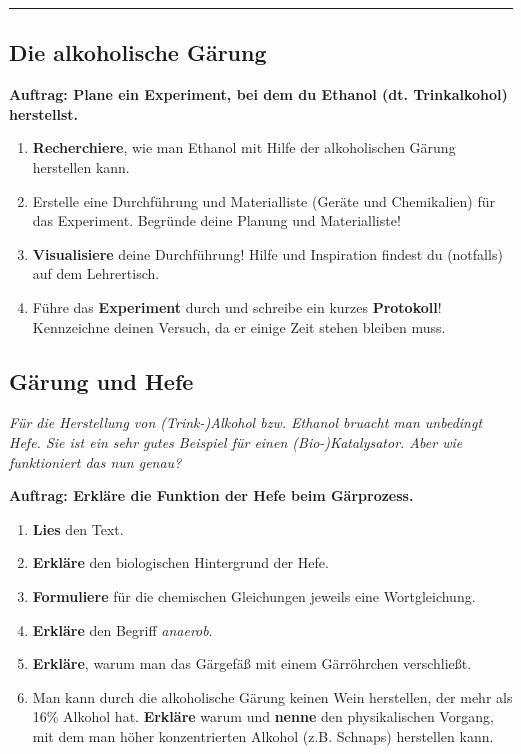 \documentclass{scrartcl}  %
\begin{document}
			\begin{center}
				\noindent\rule{18cm}{0.1pt}
			\end{center}


			
\newpage
			\subsection{Die alkoholische Gärung}
			
				\textbf{Auftrag: Plane ein Experiment, bei dem du Ethanol (dt. Trinkalkohol) herstellst.}
				\begin{enumerate}
					\item \textbf{Recherchiere}, wie man Ethanol mit Hilfe der alkoholischen Gärung herstellen kann.
					\item Erstelle eine Durchführung und Materialliste (Geräte und Chemikalien) für das Experiment. Begründe deine Planung und Materialliste! 
					\item \textbf{Visualisiere} deine Durchführung! Hilfe und Inspiration findest du (notfalls) auf dem Lehrertisch.
					\item Führe das \textbf{Experiment} durch und schreibe ein kurzes \textbf{Protokoll}! Kennzeichne deinen Versuch, da er einige Zeit stehen bleiben muss.
				\end{enumerate}

			\subsection{Gärung und Hefe}	
			
				\textit{Für die Herstellung von (Trink-)Alkohol bzw. Ethanol bruacht man unbedingt Hefe. Sie ist ein sehr gutes Beispiel für einen (Bio-)Katalysator. Aber wie funktioniert das nun genau?}\newline	
	
				\noindent \textbf{Auftrag: Erkläre die Funktion der Hefe beim Gärprozess.}
				\begin{enumerate}
					\item \textbf{Lies} den Text.
					\item \textbf{Erkläre} den biologischen Hintergrund der Hefe.
					\item \textbf{Formuliere} für die chemischen Gleichungen jeweils eine Wortgleichung.
					\item \textbf{Erkläre} den Begriff \textit{anaerob}.
					\item \textbf{Erkläre}, warum man das Gärgefäß mit einem Gärröhrchen verschließt.
					\item Man kann durch die alkoholische Gärung keinen Wein herstellen, der mehr als 16\% Alkohol hat. \textbf{Erkläre} warum und \textbf{nenne} den physikalischen Vorgang, mit dem man höher konzentrierten Alkohol (z.B. Schnaps) herstellen kann.
				\end{enumerate}
\end{document}
